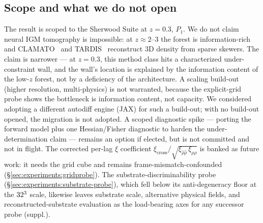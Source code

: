 \subsection{Scope and what we do not open}
\label{sec:nextsteps:scope}
The result is scoped to the Sherwood Suite at $z = 0.3$, $P_1$. We do not claim neural IGM tomography is impossible: at $z \approx 2$--$3$ the forest is information-rich and CLAMATO~\cite{lee2018clamato} and TARDIS~\cite{horowitz2019tardis} reconstruct 3D density from sparse skewers. The claim is narrower --- at $z = 0.3$, this method class hits a characterized under-constraint wall, and the wall's location is explained by the information content of the low-$z$ forest, not by a deficiency of the architecture. A scaling build-out (higher resolution, multi-physics) is not warranted, because the explicit-grid probe shows the bottleneck is information content, not capacity. We considered adopting a different autodiff engine (JAX) for such a build-out; with no build-out opened, the migration is not adopted. A scoped diagnostic spike --- porting the forward model plus one Hessian/Fisher diagnostic to harden the under-determination claim --- remains an option if elected, but is not committed and not in flight. The corrected per-lag $\xi$ coefficient $\xi_{\text{cross}}/\sqrt{\xi_{\hat\rho\hat\rho}\,\xi_{\rho\rho}}$ is banked as future work: it needs the grid cube and remains frame-mismatch-confounded (\S\ref{sec:experiments:gridprobe}). The substrate-discriminability probe (\S\ref{sec:experiments:substrate-probe}), which fell below its anti-degeneracy floor at the $32^3$ scale, likewise leaves substrate scale, alternative physical fields, and reconstructed-substrate evaluation as the load-bearing axes for any successor probe (suppl.).
